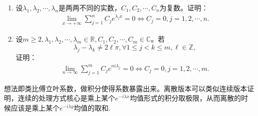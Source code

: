 \documentclass[../../main.tex]{subfiles}
\begin{document}
\begin{proposition}\label{proposition:三角求和极限结论1}
\begin{enumerate}
\item 设$\lambda_1,\lambda_2,\cdots,\lambda_n$是两两不同的实数，$C_1,C_2,\cdots,C_n$为复数。证明：
\begin{align*}
\lim_{x\to+\infty}\sum_{j=1}^n C_j e^{\lambda_j x}=0 \Leftrightarrow C_j=0,j=1,2,\cdots,n.
\end{align*}

\item 设$m\geq2,\lambda_1,\lambda_2,\cdots,\lambda_m\in\mathbb{R},C_1,C_2,\cdots,C_m\in\mathbb{C}$。若
\[
\lambda_j-\lambda_k\neq2\ell\pi,\forall1\leq j<k\leq m,\ell\in\mathbb{Z},
\]
证明：
\begin{align*}
\lim_{n\to\infty}\sum_{j=1}^m C_j e^{ni\lambda_j}=0 \Leftrightarrow C_j=0,j=1,2,\cdots,m.
\end{align*}
\end{enumerate}
\end{proposition}
\begin{note}
想法即类比傅立叶系数，做积分使得系数暴露出来。离散版本可以类似连续版本证明，连续的处理方式核心是乘上某个$e^{-i\lambda x}$均值形式的积分取极限，从而离散的时候应该是乘上某个$e^{-i\lambda y}$均值的取和.
\end{note}
\end{document}
